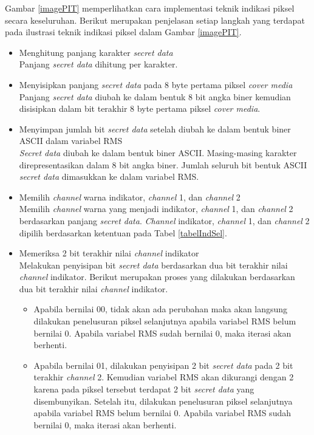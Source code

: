 \documentclass[a4paper,twoside]{article}
\begin{document}
\begin{enumerate}
\begin{itemize}
		Gambar \ref{imagePIT} memperlihatkan cara implementasi teknik indikasi piksel secara keseluruhan. Berikut merupakan penjelasan setiap langkah yang terdapat pada ilustrasi teknik indikasi piksel dalam Gambar \ref{imagePIT}.		
		\begin{itemize}
			\item Menghitung panjang karakter \textit{secret data}\\
			Panjang \textit{secret data} dihitung per karakter.
			\item Menyisipkan panjang \textit{secret data} pada 8 byte pertama piksel \textit{cover media}\\
			Panjang \textit{secret data} diubah ke dalam bentuk 8 bit angka biner kemudian disisipkan dalam bit terakhir 8 byte pertama piksel \textit{cover media}.
			\item Menyimpan jumlah bit \textit{secret data} setelah diubah ke dalam bentuk biner ASCII dalam variabel RMS\\
			\textit{Secret data} diubah ke dalam bentuk biner ASCII. Masing-masing karakter direpresentasikan dalam 8 bit angka biner. Jumlah seluruh bit bentuk ASCII \textit{secret data} dimasukkan ke dalam variabel RMS.
			\item Memilih \textit{channel} warna indikator, \textit{channel} 1, dan \textit{channel} 2\\
			Memilih \textit{channel} warna yang menjadi indikator, \textit{channel} 1, dan \textit{channel} 2 berdasarkan panjang \textit{secret data}. \textit{Channel} indikator, \textit{channel} 1, dan \textit{channel} 2 dipilih berdasarkan ketentuan pada Tabel \ref{tabelIndSel}.
			\item Memeriksa 2 bit terakhir nilai \textit{channel} indikator\\
			Melakukan penyisipan bit \textit{secret data} berdasarkan dua bit terakhir nilai \textit{channel} indikator. Berikut merupakan proses yang dilakukan berdasarkan dua bit terakhir nilai \textit{channel} indikator.
			\begin{itemize}
				\item Apabila bernilai 00, tidak akan ada perubahan maka akan langsung dilakukan penelusuran piksel selanjutnya apabila variabel RMS belum bernilai 0. Apabila variabel RMS sudah bernilai 0, maka iterasi akan berhenti.
				\item Apabila bernilai 01, dilakukan penyisipan 2 bit \textit{secret data} pada 2 bit terakhir \textit{channel} 2. Kemudian variabel RMS akan dikurangi dengan 2 karena pada piksel tersebut terdapat 2 bit \textit{secret data} yang disembunyikan. Setelah itu, dilakukan penelusuran piksel selanjutnya apabila variabel RMS belum bernilai 0. Apabila variabel RMS sudah bernilai 0, maka iterasi akan berhenti.

\end{itemize}
\end{itemize}
\end{itemize}
\end{enumerate}
\end{document}
